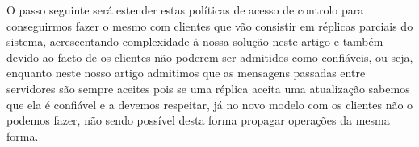 \documentclass[runningheads,a4paper]{llncs}
\begin{document}
O passo seguinte será estender estas políticas de acesso de controlo para conseguirmos fazer o mesmo com clientes que vão consistir em réplicas parciais do sistema, acrescentando complexidade à nossa solução neste artigo e também devido ao facto de os clientes não poderem ser admitidos como confiáveis, ou seja, enquanto neste nosso artigo admitimos que as mensagens passadas entre servidores são sempre aceites pois se uma réplica aceita uma atualização sabemos que ela é confiável e a devemos respeitar, já no novo modelo com os clientes não o podemos fazer, não sendo possível desta forma propagar operações da mesma forma.



\end{document}
